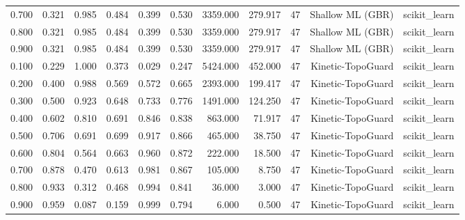 \begin{tabular}{lrrrrrrrrrr}
0.700 & 0.321 & 0.985 & 0.484 & 0.399 & 0.530 & 3359.000 & 279.917 & 47 & Shallow ML (GBR) & scikit\_learn \\
0.800 & 0.321 & 0.985 & 0.484 & 0.399 & 0.530 & 3359.000 & 279.917 & 47 & Shallow ML (GBR) & scikit\_learn \\
0.900 & 0.321 & 0.985 & 0.484 & 0.399 & 0.530 & 3359.000 & 279.917 & 47 & Shallow ML (GBR) & scikit\_learn \\
0.100 & 0.229 & 1.000 & 0.373 & 0.029 & 0.247 & 5424.000 & 452.000 & 47 & Kinetic-TopoGuard & scikit\_learn \\
0.200 & 0.400 & 0.988 & 0.569 & 0.572 & 0.665 & 2393.000 & 199.417 & 47 & Kinetic-TopoGuard & scikit\_learn \\
0.300 & 0.500 & 0.923 & 0.648 & 0.733 & 0.776 & 1491.000 & 124.250 & 47 & Kinetic-TopoGuard & scikit\_learn \\
0.400 & 0.602 & 0.810 & 0.691 & 0.846 & 0.838 & 863.000 & 71.917 & 47 & Kinetic-TopoGuard & scikit\_learn \\
0.500 & 0.706 & 0.691 & 0.699 & 0.917 & 0.866 & 465.000 & 38.750 & 47 & Kinetic-TopoGuard & scikit\_learn \\
0.600 & 0.804 & 0.564 & 0.663 & 0.960 & 0.872 & 222.000 & 18.500 & 47 & Kinetic-TopoGuard & scikit\_learn \\
0.700 & 0.878 & 0.470 & 0.613 & 0.981 & 0.867 & 105.000 & 8.750 & 47 & Kinetic-TopoGuard & scikit\_learn \\
0.800 & 0.933 & 0.312 & 0.468 & 0.994 & 0.841 & 36.000 & 3.000 & 47 & Kinetic-TopoGuard & scikit\_learn \\
0.900 & 0.959 & 0.087 & 0.159 & 0.999 & 0.794 & 6.000 & 0.500 & 47 & Kinetic-TopoGuard & scikit\_learn \\
\bottomrule
\end{tabular}